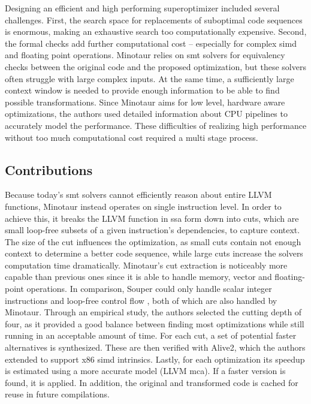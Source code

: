  	Designing an efficient and high performing superoptimizer included several challenges.
	First, the search space for replacements of suboptimal code sequences is enormous, making an exhaustive search too computationally expensive.
	Second, the formal checks add further computational cost -- especially for complex \gls*{simd} and floating point operations.
	Minotaur relies on \gls*{smt} solvers for equivalency checks between the original code and the proposed optimization, but these solvers often struggle with large complex inputs.
	At the same time, a sufficiently large context window is needed to provide enough information to be able to find possible transformations.
	Since Minotaur aims for low level, hardware aware optimizations, the authors used detailed information about CPU pipelines to accurately model the performance.
	These difficulties of realizing high performance without too much computational cost required a multi stage process. 
 	
 	\subsection{Contributions}
 	Because today's \gls*{smt} solvers cannot efficiently reason about entire LLVM functions, Minotaur instead operates on single instruction level.
	In order to achieve this, it breaks the LLVM function in \gls*{ssa} form down into cuts, which are small loop-free subsets of a given instruction's dependencies, to capture context.
	The size of the cut influences the optimization, as small cuts contain not enough context to determine a better code sequence, while large cuts increase the solvers computation time dramatically.
	Minotaur's cut extraction is noticeably more capable than previous ones since it is able to handle memory, vector and floating-point operations.
	In comparison, Souper could only handle scalar integer instructions and loop-free control flow \cite{DBLP:souper}, both of which are also handled by Minotaur.
	Through an empirical study, the authors selected the cutting depth of four, as it provided a good balance between finding most optimizations while still running in an acceptable amount of time.
	For each cut, a set of potential faster alternatives is synthesized.
	These are then verified with Alive2, which the authors extended to support x86 \gls*{simd} intrinsics.
	Lastly, for each optimization its speedup is estimated using a more accurate model (LLVM \gls*{mca}).
	If a faster version is found, it is applied.
	In addition, the original and transformed code is cached for reuse in future compilations. 


